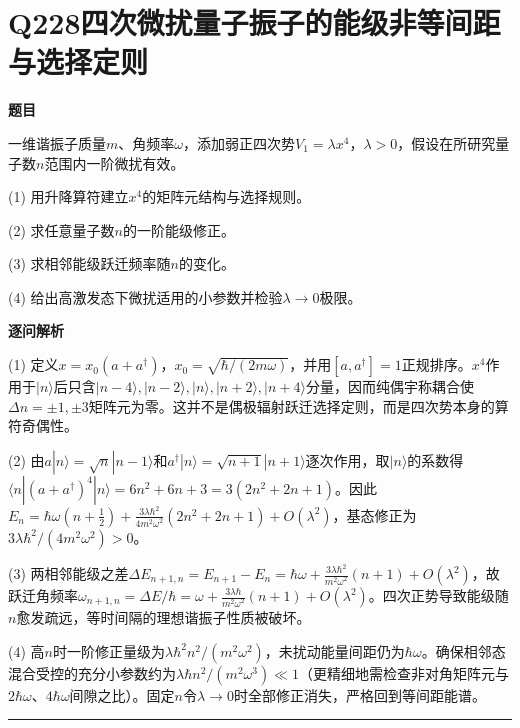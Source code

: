 \documentclass[UTF8,a4paper,11pt,oneside,openany]{ctexbook}
\begin{document}
\section*{Q228\quad 四次微扰量子振子的能级非等间距与选择定则}
\textbf{题目}\par
一维谐振子质量$m$、角频率$\omega$，添加弱正四次势$V_1=\lambda x^4$，$\lambda>0$，假设在所研究量子数$n$范围内一阶微扰有效。
\par\smallskip\noindent (1) 用升降算符建立$x^4$的矩阵元结构与选择规则。
\par\smallskip\noindent (2) 求任意量子数$n$的一阶能级修正。
\par\smallskip\noindent (3) 求相邻能级跃迁频率随$n$的变化。
\par\smallskip\noindent (4) 给出高激发态下微扰适用的小参数并检验$\lambda\to0$极限。
\par\medskip\textbf{逐问解析}\par
\par\smallskip\noindent (1) 定义$x=x_0(a+a^\dagger)$，$x_0=\sqrt{\hbar/(2m\omega)}$，并用$[a,a^\dagger]=1$正规排序。$x^4$作用于$|n\rangle$后只含$|n-4\rangle,|n-2\rangle,|n\rangle,|n+2\rangle,|n+4\rangle$分量，因而纯偶宇称耦合使$\Delta n=\pm1,\pm3$矩阵元为零。这并不是偶极辐射跃迁选择定则，而是四次势本身的算符奇偶性。
\par\smallskip\noindent (2) 由$a|n\rangle=\sqrt n|n-1\rangle$和$a^\dagger|n\rangle=\sqrt{n+1}|n+1\rangle$逐次作用，取$|n\rangle$的系数得$\langle n|(a+a^\dagger)^4|n\rangle=6n^2+6n+3=3(2n^2+2n+1)$。因此$E_n=\hbar\omega(n+\tfrac12)+\frac{3\lambda\hbar^2}{4m^2\omega^2}(2n^2+2n+1)+O(\lambda^2)$，基态修正为$3\lambda\hbar^2/(4m^2\omega^2)>0$。
\par\smallskip\noindent (3) 两相邻能级之差$\Delta E_{n+1,n}=E_{n+1}-E_n=\hbar\omega+\frac{3\lambda\hbar^2}{m^2\omega^2}(n+1)+O(\lambda^2)$，故跃迁角频率$\omega_{n+1,n}=\Delta E/\hbar=\omega+\frac{3\lambda\hbar}{m^2\omega^2}(n+1)+O(\lambda^2)$。四次正势导致能级随$n$愈发疏远，等时间隔的理想谐振子性质被破坏。
\par\smallskip\noindent (4) 高$n$时一阶修正量级为$\lambda\hbar^2 n^2/(m^2\omega^2)$，未扰动能量间距仍为$\hbar\omega$。确保相邻态混合受控的充分小参数约为$\lambda\hbar n^2/(m^2\omega^3)\ll1$（更精细地需检查非对角矩阵元与$2\hbar\omega$、$4\hbar\omega$间隙之比）。固定$n$令$\lambda\to0$时全部修正消失，严格回到等间距能谱。
\par\medskip\hrule\medskip
\end{document}
